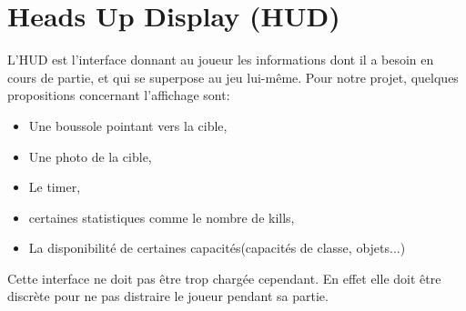\documentclass[../doc.tex ]{subfiles}
\begin{document}
\section{Heads Up Display (HUD)}
L'HUD est l'interface donnant au joueur les informations dont il a besoin en cours de partie, et qui se superpose
au jeu lui-même.
Pour notre projet, quelques propositions concernant l'affichage sont:
\begin{itemize}
    \item Une boussole pointant vers la cible,
    \item Une photo de la cible,
    \item Le timer,
    \item certaines statistiques comme le nombre de kills,
    \item La disponibilité de certaines capacités(capacités de classe, objets...)
\end{itemize}


Cette interface ne doit pas être trop chargée cependant. En effet elle doit être discrète pour ne pas distraire le joueur pendant sa partie.
\end{document}
